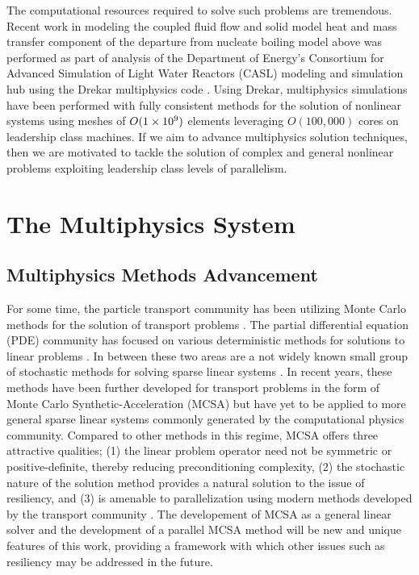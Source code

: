 The computational resources required to solve such problems are
tremendous. Recent work in modeling the coupled fluid flow and solid
model heat and mass transfer component of the departure from nucleate
boiling model above was performed as part of analysis of the
Department of Energy's Consortium for Advanced Simulation of Light
Water Reactors (CASL) modeling and simulation hub using the Drekar
multiphysics code \citep{pawlowski_drekar_2012}. Using Drekar,
multiphysics simulations have been performed with fully consistent
methods for the solution of nonlinear systems using meshes of
$O(1\times 10^{9})$ elements leveraging $O(100,000)$ cores on leadership
class machines. If we aim to advance multiphysics solution techniques,
then we are motivated to tackle the solution of complex and general
nonlinear problems exploiting leadership class levels of parallelism.

\section{The Multiphysics System}
\label{sec:multiphysics_system}

\subsection{Multiphysics Methods Advancement}
\label{subsec:methods_advancement}
For some time, the particle transport community has been utilizing
Monte Carlo methods for the solution of transport problems
\citep{lewis_computational_1993}. The partial differential equation
(PDE) community has focused on various deterministic methods for
solutions to linear problems \citep{saad_iterative_2003,
  kelley_iterative_1995}. In between these two areas are a not widely
known small group of stochastic methods for solving sparse linear
systems \citep{forsythe_matrix_1950, hammersley_monte_1964,
  halton_sequential_1962, halton_sequential_1994}. In recent years,
these methods have been further developed for transport problems in
the form of Monte Carlo Synthetic-Acceleration (MCSA)
\citep{evans_residual_2003, evans_monte_2009, evans_monte_2012} but
have yet to be applied to more general sparse linear systems commonly
generated by the computational physics community. Compared to other
methods in this regime, MCSA offers three attractive qualities; (1)
the linear problem operator need not be symmetric or
positive-definite, thereby reducing preconditioning complexity, (2)
the stochastic nature of the solution method provides a natural
solution to the issue of resiliency, and (3) is amenable to
parallelization using modern methods developed by the transport
community \citep{wagner_hybrid_2010}. The developement of MCSA as a
general linear solver and the development of a parallel MCSA method
will be new and unique features of this work, providing a framework
with which other issues such as resiliency may be addressed in the
future.

